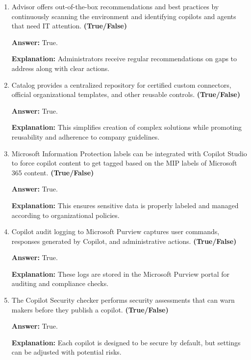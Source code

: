 \documentclass[10pt]{article}
\begin{document}
\begin{enumerate}[leftmargin=*]
\textbf{Answer:} True.

\textbf{Explanation:} This helps new makers and developers get started with building and managing copilot applications.

\item Advisor offers out-of-the-box recommendations and best practices by continuously scanning the environment and identifying copilots and agents that need IT attention. \textbf{(True/False)}

\textbf{Answer:} True.

\textbf{Explanation:} Administrators receive regular recommendations on gaps to address along with clear actions.

\item Catalog provides a centralized repository for certified custom connectors, official organizational templates, and other reusable controls. \textbf{(True/False)}

\textbf{Answer:} True.

\textbf{Explanation:} This simplifies creation of complex solutions while promoting reusability and adherence to company guidelines.

\item Microsoft Information Protection labels can be integrated with Copilot Studio to force copilot content to get tagged based on the MIP labels of Microsoft 365 content. \textbf{(True/False)}

\textbf{Answer:} True.

\textbf{Explanation:} This ensures sensitive data is properly labeled and managed according to organizational policies.

\item Copilot audit logging to Microsoft Purview captures user commands, responses generated by Copilot, and administrative actions. \textbf{(True/False)}

\textbf{Answer:} True.

\textbf{Explanation:} These logs are stored in the Microsoft Purview portal for auditing and compliance checks.

\item The Copilot Security checker performs security assessments that can warn makers before they publish a copilot. \textbf{(True/False)}

\textbf{Answer:} True.

\textbf{Explanation:} Each copilot is designed to be secure by default, but settings can be adjusted with potential risks.


\end{enumerate}
\end{document}
